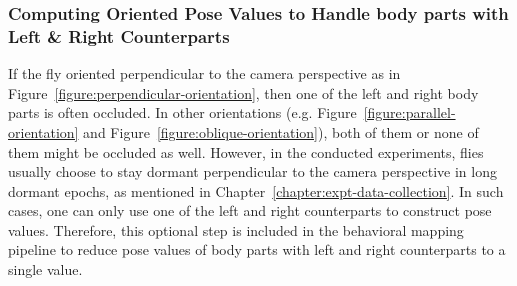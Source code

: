 \subsubsection{Computing Oriented Pose Values to Handle body parts with Left \& Right Counterparts}
If the fly oriented perpendicular to the camera perspective as in Figure~\ref{figure:perpendicular-orientation}, then one of the left and right body parts is often occluded.
In other orientations (e.g. Figure~\ref{figure:parallel-orientation} and Figure~\ref{figure:oblique-orientation}),  both of them or none of them might be occluded as well.
However, in the conducted experiments, flies usually choose to stay dormant perpendicular to the camera perspective in long dormant epochs, as mentioned in Chapter~\ref{chapter:expt-data-collection}.
In such cases, one can only use one of the left and right counterparts to construct pose values.
Therefore, this optional step is included in the behavioral mapping pipeline to reduce pose values of body parts with left and right counterparts to a single value.

